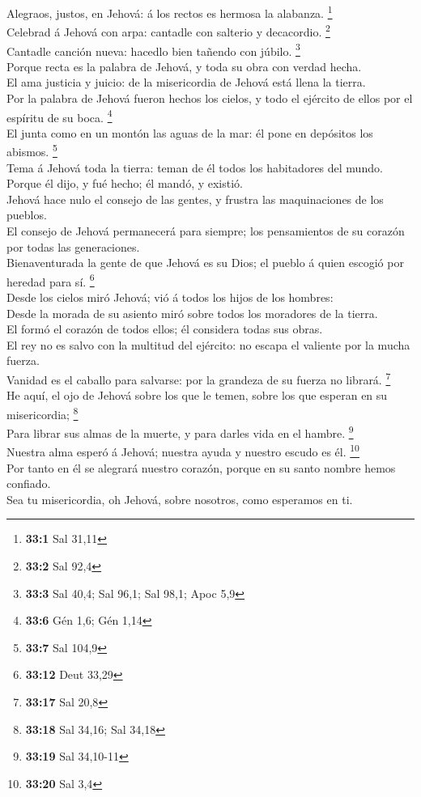  Alegraos, justos, en Jehová: á los rectos es hermosa la
alabanza. \footnote{\textbf{33:1} Sal 31,11}\\
 Celebrad á Jehová con arpa: cantadle con salterio y
decacordio. \footnote{\textbf{33:2} Sal 92,4}\\
 Cantadle canción nueva: hacedlo bien tañendo con júbilo.
\footnote{\textbf{33:3} Sal 40,4; Sal 96,1; Sal 98,1; Apoc 5,9}\\
 Porque recta es la palabra de Jehová, y toda su obra con
verdad hecha.\\
 El ama justicia y juicio: de la misericordia de Jehová
está llena la tierra.\\
 Por la palabra de Jehová fueron hechos los cielos, y todo
el ejército de ellos por el espíritu de su boca. \footnote{\textbf{33:6}
  Gén 1,6; Gén 1,14}\\
 El junta como en un montón las aguas de la mar: él pone
en depósitos los abismos. \footnote{\textbf{33:7} Sal 104,9}\\
 Tema á Jehová toda la tierra: teman de él todos los
habitadores del mundo.\\
 Porque él dijo, y fué hecho; él mandó, y existió.\\
 Jehová hace nulo el consejo de las gentes, y frustra las
maquinaciones de los pueblos.\\
 El consejo de Jehová permanecerá para siempre; los
pensamientos de su corazón por todas las generaciones.\\
 Bienaventurada la gente de que Jehová es su Dios; el
pueblo á quien escogió por heredad para sí. \footnote{\textbf{33:12}
  Deut 33,29}\\
 Desde los cielos miró Jehová; vió á todos los hijos de
los hombres:\\
 Desde la morada de su asiento miró sobre todos los
moradores de la tierra.\\
 El formó el corazón de todos ellos; él considera todas
sus obras.\\
 El rey no es salvo con la multitud del ejército: no
escapa el valiente por la mucha fuerza.\\
 Vanidad es el caballo para salvarse: por la grandeza de
su fuerza no librará. \footnote{\textbf{33:17} Sal 20,8}\\
 He aquí, el ojo de Jehová sobre los que le temen, sobre
los que esperan en su misericordia; \footnote{\textbf{33:18} Sal 34,16;
  Sal 34,18}\\
 Para librar sus almas de la muerte, y para darles vida
en el hambre. \footnote{\textbf{33:19} Sal 34,10-11}\\
 Nuestra alma esperó á Jehová; nuestra ayuda y nuestro
escudo es él. \footnote{\textbf{33:20} Sal 3,4}\\
 Por tanto en él se alegrará nuestro corazón, porque en
su santo nombre hemos confiado.\\
 Sea tu misericordia, oh Jehová, sobre nosotros, como
esperamos en ti.

